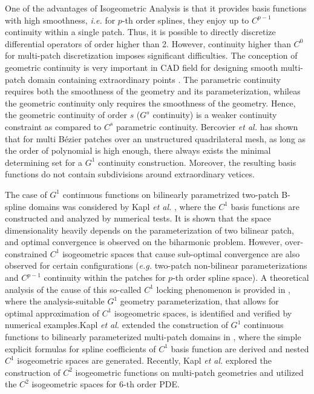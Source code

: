 One of the advantages of Isogeometric Analysis is that it provides basis functions with high smoothness, \textit{i.e.} for $p$-th order splines, they enjoy up to $C^{p-1}$ continuity within a single patch. Thus, it is possible to directly discretize differential operators of order higher than 2. However, continuity higher than $C^0$ for multi-patch discretization imposes significant difficulties. The conception of geometric continuity is very important in CAD field \cite{peters_chapter_2002} for designing smooth multi-patch domain containing extraordinary points \cite{peters_joining_1992}. The parametric continuity requires both the smoothness of the geometry and its parameterization, whileas the geometric continuity only requires the smoothness of the geometry. Hence, the geometric continuity of order $s$ ($G^s$ continuity) is a weaker continuity constraint as compared to $C^s$ parametric continuity. Bercovier \textit{et al.} \cite{bercovier_smooth_2014} has shown that for multi B\'ezier patches over an unstructured quadrilateral mesh, as long as the order of polynomial is high enough, there always exists the minimal determining set for a $G^1$ continuity construction. Moreover, the resulting basis functions do not contain subdivisions around extraordinary vetices.\par

The case of $G^1$ continuous functions on bilinearly parametrized two-patch B-spline domains was considered by Kapl \textit{et al.} \cite{kapl_isogeometric_2015}, where the $C^1$ basis functions are constructed and analyzed by numerical tests. It is shown that the space dimensionality heavily depends on the parameterization of two bilinear patch, and optimal convergence is observed on the biharmonic problem. However, over-constrained $C^1$ isogeometric spaces that cause sub-optimal convergence are also observed for certain configurations (\textit{e.g.} two-patch non-bilinear parameterizations and $C^{p-1}$ continuity within the patches for $p$-th order spline space). A theoretical analysis of the cause of this so-called $C^1$ locking phenomenon is provided in \cite{collin_analysis-suitable_2016}, where the analysis-suitable $G^1$ geometry parameterization, that allows for optimal approximation of $C^1$ isogeometric spaces, is identified and verified by numerical examples.Kapl \textit{et al.} extended the construction of $G^1$ continuous functions to bilinearly parameterized multi-patch domains in \cite{kapl_isogeometric_2017}, where the simple explicit formulas for spline coefficients of $C^1$ basis function are derived and nested $C^1$ isogeometric spaces are generated. Recently, Kapl \textit{et al.} \cite{kapl_space_2017,kapl_space_nodate} explored the construction of $C^2$ isogeometric functions on multi-patch geometries and utilized the $C^2$ isogeometric spaces for $6$-th order PDE.\par

